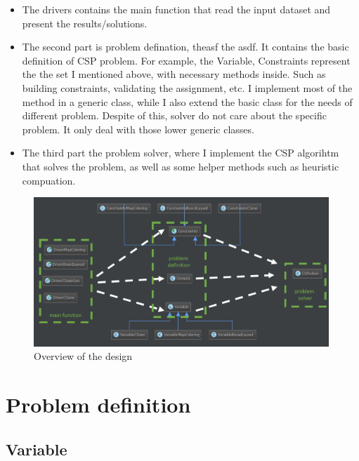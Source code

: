 \documentclass{article}
\begin{document}
\begin{itemize}
  \item The drivers contains the main function that read the input dataset and present the results/solutions.
  \item  The second part is problem defination, theasf the asdf. It contains the basic definition of CSP problem. For example, the Variable, Constraints represent the the set I mentioned above, with necessary methods inside. Such as building constraints, validating the assignment, etc. I implement most of the method in a generic class, while I also extend the basic class for the needs of different problem. Despite of this, solver do not care about the specific problem. It only deal with those lower generic classes.
  \item The third part the problem solver, where I implement the CSP algorihtm that solves the problem, as well as some helper methods such as heuristic compuation.
\end{itemize}
\begin{figure}[!h]
\centering
\includegraphics[width=0.99\textwidth]{class_layout.png}
\caption{Overview of the design}
\label{classlayout}
\end{figure}













\clearpage
\section{Problem definition}




\subsection{Variable}
\end{document}
